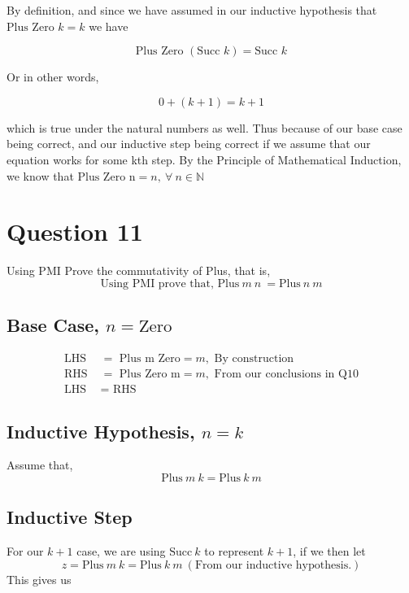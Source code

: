 \documentclass{article}
\begin{document}
    By definition, and since we have assumed in our inductive hypothesis that $\text{Plus Zero } k = k$ we have
    
    $$
    \text{Plus Zero } ( \text{Succ } k) = \text{Succ } k
    $$

    Or in other words,

    $$
    0 + (k + 1) = k + 1
    $$

    which is true under the natural numbers as well. Thus because of our base case being correct, and our inductive step being correct if we assume that our equation works for some kth step. By the Principle of Mathematical Induction, we know that $\text{Plus Zero n} = n,\ \forall\ n \in \mathbb{N}$

\clearpage

\section{Question 11}

Using PMI Prove the commutativity of Plus, that is,
$$
\text{Using PMI prove that, Plus}\ m\ n\ = \text{Plus}\ n\ m
$$

\subsection{\textbf{Base Case}, $n = \text{Zero}$}

    $$
    \begin{aligned}
        \text{LHS } & = \text{ Plus m Zero} = m, \text{ By construction}\\
        \text{RHS } & = \text{ Plus Zero m} = m, \text{ From our conclusions in Q10}\\
        \text{LHS } & = \text{ RHS}
    \end{aligned}
    $$
    

\subsection{\textbf{Inductive Hypothesis}, $n = k$}

    Assume that,
    $$
    \text{Plus}\ m\ k = \text{Plus}\ k\ m
    $$

\subsection{\textbf{Inductive Step}}

    For our $k + 1$ case, we are using $\text{Succ}\ k$ to represent $k + 1$, if we then let 
    \begin{equation}
        z = \text{Plus}\ m\ k = \text{Plus}\ k\ m\ (\text{From our inductive hypothesis.})
    \end{equation}
    This gives us
    
\end{document}
